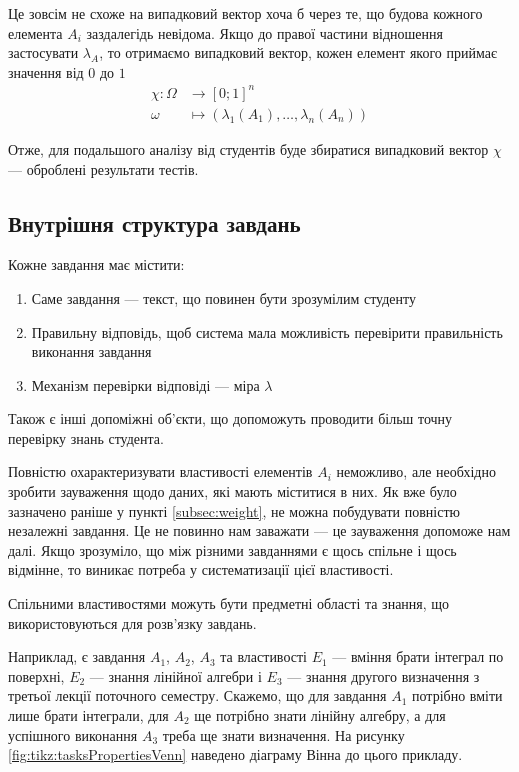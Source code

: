 Це зовсім не схоже на випадковий вектор хоча б через те, що будова кожного
елемента $A_i$ заздалегідь невідома.
Якщо до правої частини відношення застосувати $\lambda_A$, то отримаємо
випадковий вектор, кожен елемент якого приймає значення від $0$ до $1$
\begin{align*}
  \chi: \Omega &\rightarrow \left[ 0; 1 \right]^n \\
  \omega &\mapsto \left( \lambda_1\left( A_1 \right), \dots,
    \lambda_n\left( A_n \right) \right)
\end{align*}

Отже, для подальшого аналізу від студентів буде збиратися випадковий вектор
$\chi$ --- оброблені результати тестів.

\subsection{Внутрішня структура завдань}

Кожне завдання має містити:
\begin{enumerate}
  \item
    Саме завдання --- текст, що повинен бути зрозумілим студенту
  \item
    Правильну відповідь, щоб система мала можливість перевірити правильність
    виконання завдання
  \item
    Механізм перевірки відповіді --- міра $\lambda$
\end{enumerate}

Також є інші допоміжні об’єкти, що допоможуть проводити більш точну перевірку
знань студента.

Повністю охарактеризувати властивості елементів $A_i$ неможливо, але необхідно
зробити зауваження щодо даних, які мають міститися в них.
Як вже було зазначено раніше у пункті \ref{subsec:weight}, не можна побудувати
повністю незалежні завдання.
Це не повинно нам заважати --- це зауваження допоможе нам далі.
Якщо зрозуміло, що між різними завданнями є щось спільне і щось відмінне, то
виникає потреба у систематизації цієї властивості.

Спільними властивостями можуть бути предметні області та знання, що
використовуються для розв’язку завдань.

Наприклад, є завдання $A_1$, $A_2$, $A_3$ та властивості $E_1$ --- вміння
брати інтеграл по поверхні, $E_2$ --- знання лінійної алгебри і $E_3$ ---
знання другого визначення з третьої лекції поточного семестру.
Скажемо, що для завдання $A_1$ потрібно вміти лише брати інтеграли, для $A_2$
ще потрібно знати лінійну алгебру, а для успішного виконання $A_3$ треба ще
знати визначення.
На рисунку \ref{fig:tikz:tasksPropertiesVenn} наведено діаграму Вінна до цього
прикладу.

